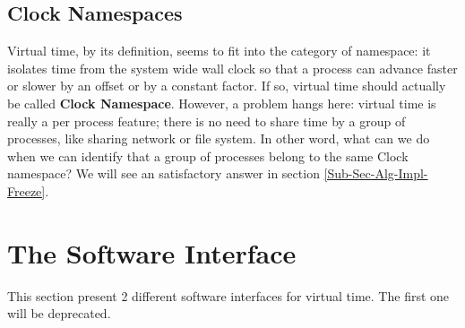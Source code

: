 \documentclass{acm_proc_article-sp}
\begin{document}
\subsection{Clock Namespaces}
Virtual time, by its definition, seems to fit into the category of namespace: it isolates time from the system wide wall clock so that a process can advance faster or slower by an offset or by a constant factor. 
If so, virtual time should actually be called \textbf{Clock Namespace}. However, a problem hangs here: virtual time is really a per process feature; there is no need to share time by a group of processes, like sharing network or file system. 
In other word, what can we do when we can identify that a group of processes belong to the same Clock namespace? We will see an satisfactory answer in section \ref{Sub-Sec-Alg-Impl-Freeze}.

\section{The Software Interface}
This section present 2 different software interfaces for virtual time. The first one will be deprecated.
\end{document}
